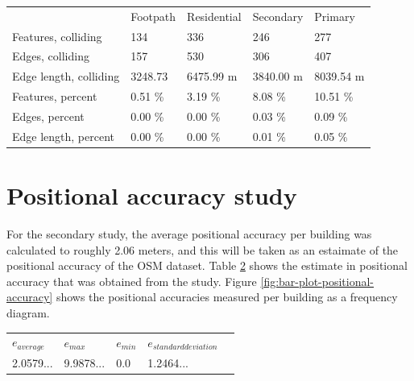 \documentclass{kththesis}
\begin{document}
\begin{table}[H]
    \begin{tabular}{lllll}
                                & Footpath      & Residential  & Secondary   & Primary     \\
        Features, colliding     & 134           & 336          & 246         & 277         \\
        Edges, colliding        & 157           & 530          & 306         & 407         \\
        Edge length, colliding  & 3248.73       & 6475.99 m    & 3840.00 m   & 8039.54 m   \\
        Features, percent       & 0.51 \%       & 3.19 \%      & 8.08 \%     & 10.51 \%    \\
        Edges, percent          & 0.00 \%       & 0.00 \%      & 0.03 \%     & 0.09 \%     \\
        Edge length, percent    & 0.00 \%       & 0.00 \%      & 0.01 \%     & 0.05 \%

    \end{tabular}
    \label{table:road-collision-corrected}
\end{table}

\section{Positional accuracy study}

For the secondary study, the average positional accuracy per building was calculated to roughly 2.06 meters, and this will be taken as an estaimate of the positional accuracy of the OSM dataset.
Table \ref{table:positional-accuracy} shows the estimate in positional accuracy that was obtained from the study.
Figure \ref{fig:bar-plot-positional-accuracy} shows the positional accuracies measured per building as a frequency diagram.

\begin{table}[H]
    \begin{tabular}{lllll}
        $e_{average}$ & $e_{max}$ & $e_{min}$ & $e_{standard deviation}$ \\
        2.0579... & 9.9878... & 0.0 & 1.2464...
    \end{tabular}
    \label{table:positional-accuracy}
\end{table}
\end{document}
